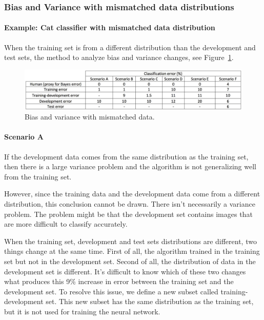 \documentclass[UTF8]{article}
\begin{document}
\subsubsection{Bias and Variance with mismatched data distributions}
\paragraph{Example: Cat classifier with mismatched data distribution}
When the training set is from a different distribution than the development and test sets, the
method to analyze bias and variance changes, see
Figure~\ref{fig:bias-variance-with-mismatched-data}.

\begin{figure}[htb]
    \centering
    \includegraphics[width=50em]{figures/bias-variance-with-mismatched-data}
    \caption{Bias and variance with mismatched data.}
    \label{fig:bias-variance-with-mismatched-data}
\end{figure}

\paragraph{Scenario A}
If the development data comes from the same distribution as the training set, then there is a large
variance problem and the algorithm is not generalizing well from the training set.

However, since the training data and the development data come from a different distribution, this
conclusion cannot be drawn. There isn't necessarily a variance problem. The problem might be that
the development set contains images that are more difficult to classify accurately.

When the training set, development and test sets distributions are different, two things change at
the same time. First of all, the algorithm trained in the training set but not in the development
set. Second of all, the distribution of data in the development set is different. It's difficult to
know which of these two changes what produces this 9\% increase in error between the training set
and the development set. To resolve this issue, we define a new subset called training-development
set. This new subset has the same distribution as the training set, but it is not used for training
the neural network.
\end{document}
